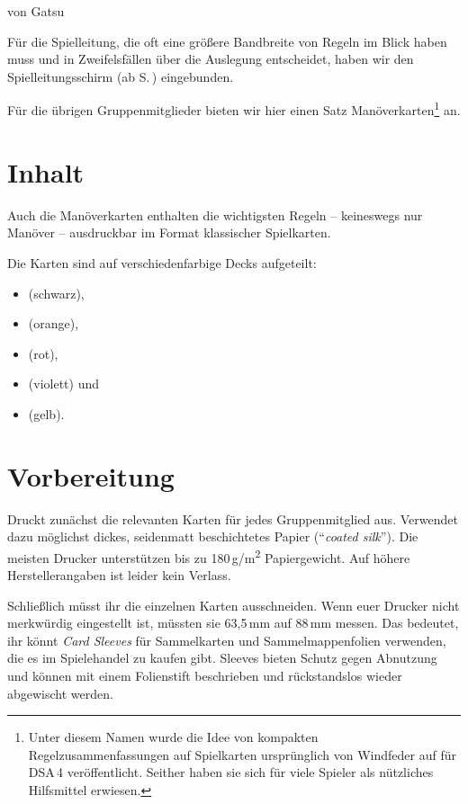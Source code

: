 \documentclass[openright]{Ilaris}
\begin{document}
\mbox{}

\neueseite


\label{karten}
\begin{center}
von Gatsu
\end{center}
\normalfont
\spaltenanfang
Für die Spielleitung, die oft eine größere Bandbreite von Regeln im Blick haben muss und in Zweifelsfällen über die Auslegung entscheidet,
haben wir den Spielleitungsschirm (ab S.\,\pageref{schirm}) eingebunden.

Für die übrigen Gruppenmitglieder bieten wir hier einen Satz Manöverkarten\footnote{%
	Unter diesem Namen wurde die Idee von kompakten Regelzusammenfassungen auf Spielkarten ursprünglich von Windfeder auf  für DSA\,4 veröffentlicht. Seither haben sie sich für viele Spieler als nützliches Hilfsmittel erwiesen.} an.

\section*{Inhalt}
Auch die Manöverkarten enthalten die wichtigsten Regeln -- keineswegs nur Manöver -- ausdruckbar im Format klassischer Spielkarten.

Die Karten sind auf verschiedenfarbige Decks aufgeteilt:
\begin{itemize}
\item {} (schwarz),
\item {} (orange),
\item {} (rot),
\item {} (violett) und
\item {} (gelb).
\end{itemize}

\section*{Vorbereitung}
Druckt zunächst die relevanten Karten für jedes Gruppenmitglied aus.
Verwendet dazu möglichst dickes, seidenmatt beschichtetes Papier (\enquote{\textit{coated silk}}).
Die meisten Drucker unterstützen bis zu 180\,g/m\textsuperscript{2} Papiergewicht. Auf höhere Herstellerangaben ist leider kein Verlass.

Schließlich müsst ihr die einzelnen Karten ausschneiden.
Wenn euer Drucker nicht merkwürdig eingestellt ist, müssten sie 63,5\,mm auf 88\,mm messen.
Das bedeutet, ihr könnt \textit{Card Sleeves} für Sammelkarten und Sammelmappenfolien verwenden,
die es im Spielehandel zu kaufen gibt.
Sleeves bieten Schutz gegen Abnutzung und können mit einem Folienstift beschrieben und rückstandslos wieder abgewischt werden.
\end{document}
